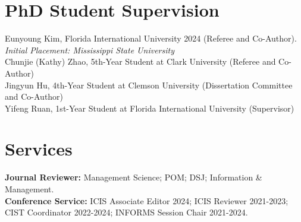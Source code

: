 \documentclass[margin,line]{resume}
\begin{document}
\begin{resume}
         


      \section{\mysidestyle PhD Student Supervision} 
         Eunyoung Kim, Florida International University 2024 (Referee and Co-Author). \textit{Initial Placement: Mississippi State University} \\
         Chunjie (Kathy) Zhao, 5th-Year Student at Clark University (Referee and Co-Author)\\
         Jingyun Hu, 4th-Year Student at Clemson University (Dissertation Committee and Co-Author)\\
         Yifeng Ruan, 1st-Year Student at Florida International University (Supervisor)

      \section{\mysidestyle Services} 
         \textbf{Journal Reviewer:} Management Science; POM; DSJ; Information \& Management.\\
         \textbf{Conference Service:} ICIS Associate Editor 2024; ICIS Reviewer 2021-2023; CIST Coordinator 2022-2024; INFORMS Session Chair 2021-2024.


\end{resume}
\end{document}
